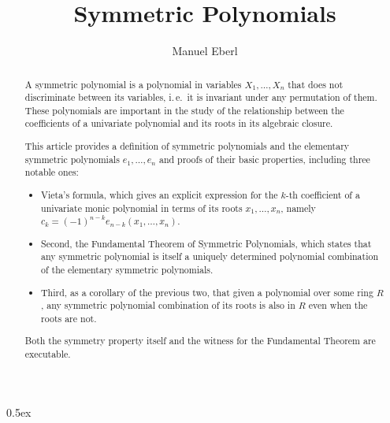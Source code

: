 \documentclass[11pt,a4paper]{article}
\begin{document}
\title{Symmetric Polynomials}
\author{Manuel Eberl}
\maketitle

\begin{abstract}
A symmetric polynomial is a polynomial in variables $X_1, \ldots, X_n$ that does not discriminate between its variables, i.\,e.\ it is invariant under any permutation of them. These polynomials are important in the study of the relationship between the coefficients of a univariate polynomial and its roots in its algebraic closure.

This article provides a definition of symmetric polynomials and the elementary symmetric polynomials $e_1,\ldots, e_n$ and proofs of their basic properties, including three notable ones:
\begin{itemize}
\item Vieta's formula, which gives an explicit expression for the $k$-th coefficient of a univariate monic polynomial in terms of its roots $x_1,\ldots,x_n$, namely $c_k = (-1)^{n-k}e_{n-k}(x_1,\ldots,x_n)$.
\item Second, the Fundamental Theorem of Symmetric Polynomials, which states that any symmetric polynomial is itself a uniquely determined polynomial combination of the elementary symmetric polynomials.
\item Third, as a corollary of the previous two, that given a polynomial over some ring $R$, any symmetric polynomial combination of its roots is also in $R$ even when the roots are not.
\end{itemize}
Both the symmetry property itself and the witness for the Fundamental Theorem are executable.
\end{abstract}

\newpage
\tableofcontents
\newpage
\parindent 0pt\parskip 0.5ex



\nocite{blum_smith_coskey13}


\end{document}
